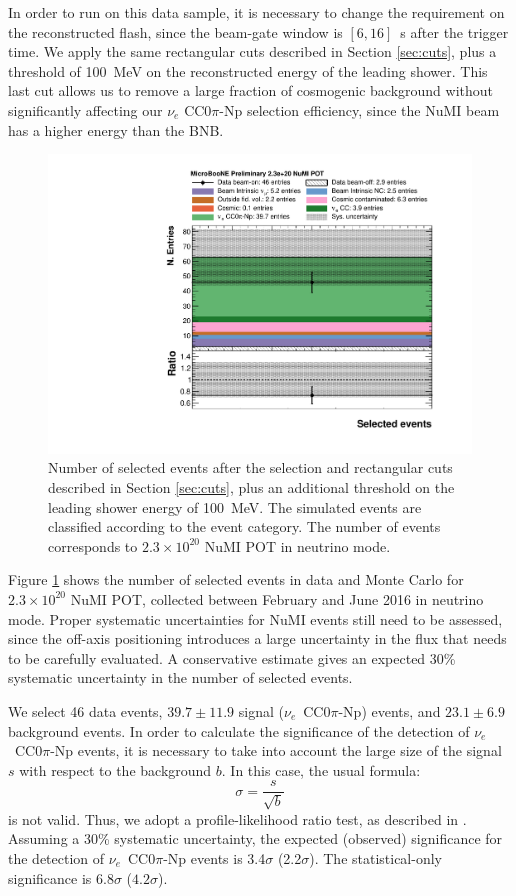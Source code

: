 In order to run on this data sample, it is necessary to change the requirement on the reconstructed flash, since the beam-gate window is $[6,16]$~\si{\micro}s after the trigger time.
We apply the same rectangular cuts described in Section \ref{sec:cuts}, plus a threshold of 100~MeV on the reconstructed energy of the leading shower. This last cut allows us to remove a large fraction of cosmogenic background without significantly affecting our $\nu_e$ CC0$\pi$-Np selection efficiency, since the NuMI beam has a higher energy than the BNB.

\begin{figure}[htbp]
\centering
  \includegraphics[width=0.75\linewidth]{figures/numi_events.pdf}
  \caption{Number of selected events after the selection and rectangular cuts described in Section \ref{sec:cuts}, plus an additional threshold on the leading shower energy of 100~MeV. The simulated events are classified according to the event category. The number of events corresponds to $2.3\times10^{20}$ NuMI POT in neutrino mode.}\label{fig:numi_nue}
\end{figure}

Figure \ref{fig:numi_nue} shows the number of selected events in data and Monte Carlo for $2.3\times10^{20}$ NuMI POT, collected between February and June 2016 in neutrino mode. Proper systematic uncertainties for NuMI events still need to be assessed, since the off-axis positioning introduces a large uncertainty in the flux that needs to be carefully evaluated. A conservative estimate gives an expected 30\% systematic uncertainty in the number of selected events.

We select 46 data events, $39.7\pm11.9$ signal ($\nu_e$~CC0$\pi$-Np) events, and $23.1\pm6.9$ background events. In order to calculate the significance of the detection of $\nu_e$~CC0$\pi$-Np events, it is necessary to take into account the large size of the signal $s$ with respect to the background $b$. In this case, the usual formula:
\begin{equation}
    \sigma = \frac{s}{\sqrt{b}}
\end{equation}
is not valid. Thus, we adopt a profile-likelihood ratio test, as described in \cite{Cowan:2010js}.
Assuming a 30\% systematic uncertainty, the expected (observed) significance for the detection of $\nu_e$~CC0$\pi$-Np events is 3.4$\sigma$ (2.2$\sigma$). The statistical-only significance is $6.8\sigma$ ($4.2\sigma$).

